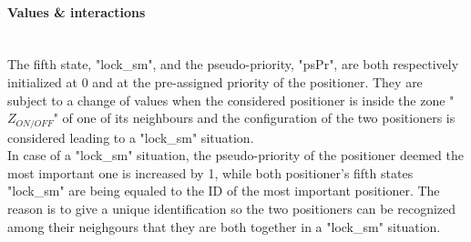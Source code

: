 \documentclass[]{spie}  %
\begin{document}
	\paragraph{Values \& interactions}\mbox{}\\
	The fifth state, "lock\_sm", and the pseudo-priority, "psPr", are both respectively initialized at 0 and at the pre-assigned priority of the positioner. They are subject to a change of values when the considered positioner is inside the zone "$Z_{ON/OFF}$" of one of its neighbours and the configuration of the two positioners is considered leading to a "lock\_sm" situation. \\
	In case of a "lock\_sm" situation, the pseudo-priority of the positioner deemed the most important one is increased by 1, while both positioner's fifth states "lock\_sm" are being equaled to the ID of the most important positioner. The reason is to give a unique identification so the two positioners can be recognized among their neighgours that they are both together in a "lock\_sm" situation.\\ 
	
\end{document}
